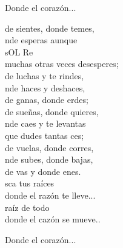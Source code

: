 \begin{cancion}
	\begin{chorus}%
Donde el corazón... \\
	\end{chorus}%
	de sientes, donde temes,  \\
	nde esperas aunque \\
       sOL              Re\\
muchas otras veces desesperes; \\
	de luchas y te rindes, \\
	nde haces y deshaces,\\
	de ganas, donde erdes;\\
	de sueñas, donde quieres, \\
	nde caes y te levantas\\
	que dudes tantas ces; \\
	de vuelas, donde corres,\\
	nde subes, donde bajas, \\
	de vas y donde enes. \\
	sca tus raíces \\
	donde el razón te lleve... \\
	 raíz de todo \\
	donde el cazón se mueve.. \\
	\begin{chorus}%
Donde el corazón...\\
	\end{chorus}%
\end{cancion}%
